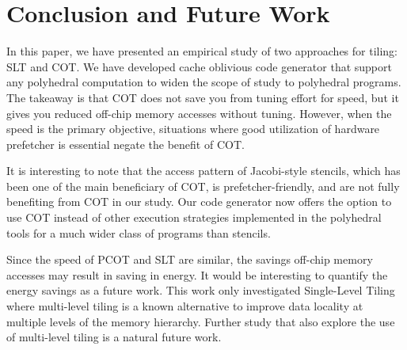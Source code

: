 \section{Conclusion and Future Work}
\label{sec:conclusion}

In this paper, we have presented an empirical study of two approaches for
tiling: SLT and COT. We have developed cache oblivious code generator that
support any polyhedral computation to widen the scope of study to polyhedral
programs.  The takeaway is that COT does not save you from tuning effort for
speed, but it gives you reduced off-chip memory accesses without tuning.
However, when the speed is the primary objective, situations where good
utilization of hardware prefetcher is essential negate the benefit of COT.

It is interesting to note that the access pattern of Jacobi-style stencils,
which has been one of the main beneficiary of COT, is prefetcher-friendly, and
are not fully benefiting from COT in our study. Our code generator now offers
the option to use COT instead of other execution strategies implemented in the
polyhedral tools for a much wider class of programs than stencils.  

Since the speed of PCOT and SLT are similar, the savings off-chip memory
accesses may result in saving in energy. It would be interesting to quantify
the energy savings as a future work.  This work only investigated Single-Level
Tiling where multi-level tiling is a known alternative to improve data
locality at multiple levels of the memory hierarchy.  Further study that also
explore the use of multi-level tiling is a natural future work.



